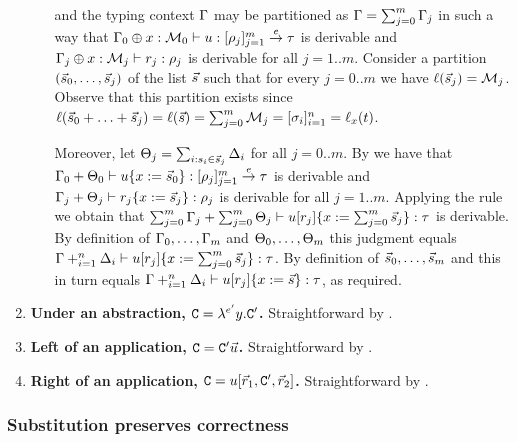 \begin{enumerate}
\begin{enumerate}
      and
      the typing context $\Gamma$
      may be partitioned as $\Gamma = \sum_{j=0}^{m} \Gamma_j$
      in such a way that
      $\Gamma_0 \oplus x : \mathcal{M}_0 \vdash u : [\rho_j]_{j=1}^m \overset{e}{\to} \tau$
      is derivable
      and
      $\Gamma_j \oplus x : \mathcal{M}_j \vdash r_j : \rho_j$ is derivable for all $j=1..m$.
      Consider a partition $(\vec{s}_0,\hdots,\vec{s}_j)$
      of the list $\vec{s}$ 
      such that for every $j=0..m$ we have $\ell(\vec{s}_j) = \mathcal{M}_j$.
      Observe that this partition exists since $\ell(\vec{s}_0 + \hdots + \vec{s}_j) = \ell(\vec{s}) = \sum_{j=0}^m \mathcal{M}_j = [\sigma_i]_{i=1}^n = \ell_{x}(t)$.

      Moreover, let $\Theta_j = \sum_{i : s_i \in \vec{s}_j} \Delta_i$ for all $j=0..m$.
      By \ih we have that
      $\Gamma_0 + \Theta_0 \vdash u\{x := \vec{s}_0\} : [\rho_j]_{j=1}^m \overset{e}{\to} \tau$
      is derivable
      and
      $\Gamma_j + \Theta_j \vdash r_j\{x := \vec{s}_j\} : \rho_j$
      is derivable for all $j=1..m$.
      Applying the \indrulename{\toE} rule we obtain
      that
      $\sum_{j=0}^m \Gamma_j + \sum_{j=0}^m \Theta_j \vdash u[r_j]\{x := \sum_{j=0}^m \vec{s}_j\} : \tau$
      is derivable.
      By definition of
      $\Gamma_0,\hdots,\Gamma_m$ and
      $\Theta_0,\hdots,\Theta_m$
      this judgment equals
      $\Gamma +_{i=1}^n \Delta_i \vdash u[r_j]\{x := \sum_{j=0}^m \vec{s}_j\} : \tau$.
      By definition of $\vec{s}_0,\hdots,\vec{s}_m$
      and 
      this in turn equals
      $\Gamma +_{i=1}^n \Delta_i \vdash u[r_j]\{x := \vec{s}\} : \tau$,
      as required.
    \end{enumerate}
  \item {\bf Under an abstraction, $\mathtt{C} = \lambda^{e'} y. \mathtt{C}'$.}
    Straightforward by \ih.
  \item {\bf Left of an application, $\mathtt{C} = \mathtt{C}'\vec{u}$.}
    Straightforward by \ih.
  \item {\bf Right of an application, $\mathtt{C} = u[\vec{r}_1,\mathtt{C}',\vec{r}_2]$.}
    Straightforward by \ih.
  \end{enumerate}

\subsubsection{Substitution preserves correctness}

